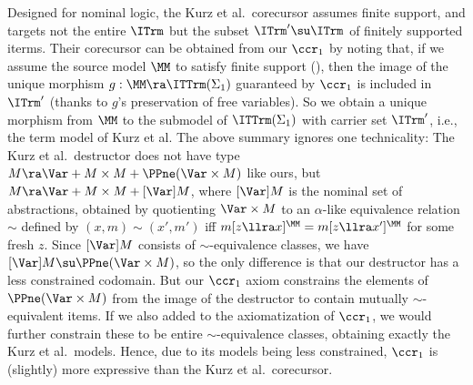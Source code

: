 Designed %
for %
nominal logic, the Kurz et al.\ corecursor 
assumes finite support, %
and %
targets 
not the entire %
$\ITrm$ but the subset $\ITrm'\su \ITrm$ of finitely supported iterms.
Their corecursor can be obtained from our 
$\ccr_1$ by noting that, %
 if we assume the source model $\MM$ to satisfy finite support (\FSupFv{}), then 
	the image of the unique morphism $g: \MM \ra \ITTrm(\Sigma_1)$ 
	guaranteed by $\ccr_1$ is included in $\ITrm'$ (thanks to $g$'s preservation of free variables). %
So we obtain a unique morphism from $\MM$ to the submodel of $\ITTrm(\Sigma_1)$ with carrier set $\ITrm'$, i.e., the term model of Kurz et al.  
%
\label{alterDest}
The above summary %
ignores one technicality: %
The 
Kurz et al.\ destructor
does not have type $M \ra \Var + 
M \times M + \PPne(\Var\times M)$ like ours, but %
$M \ra \Var + 
M \times M + [\Var]M$, 
where 
$[\Var]M$ is the nominal set of abstractions, obtained by quotienting $\Var\times M$ to an $\alpha$-like equivalence relation $\sim$ defined by $(x,m) \!\sim\! (x',m')$ iff 
$m[z \llra x]^{\MM} = m[z \llra x']^{\MM}$ for some fresh $z$. 
Since $[\Var]M$ consists of $\sim$-equivalence classes, we have  
$[\Var]M \su \PPne(\Var\times M)$, so the only difference is that 
our destructor has a less constrained codomain. But our $\ccr_1$ axiom \IPmBvr{}
constrains the elements of $\PPne(\Var\times M)$ from the image of the 
destructor to contain
mutually $\sim$-equivalent items. If we also added 
\IIPmBvr{} %
to the axiomatization of $\ccr_1$, we would further constrain these to be entire $\sim$-equivalence classes, obtaining exactly the  
Kurz et al.\ models. %
Hence, due to its models being %
less constrained, %
$\ccr_1$ is (slightly) more expressive than the Kurz et al.\ corecursor. 

